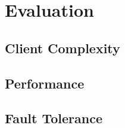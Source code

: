 \section{Evaluation} \label{section:evaluation}

\subsection{Client Complexity}

\subsection{Performance}

\subsection{Fault Tolerance}
